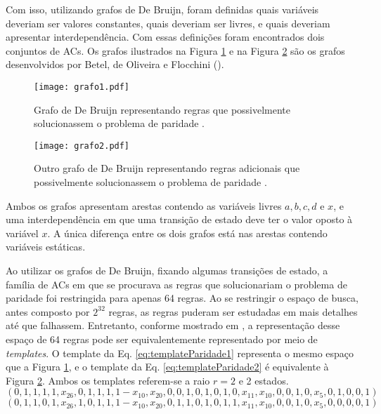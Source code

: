 Com isso, utilizando grafos de De Bruijn, foram definidas quais variáveis deveriam ser valores constantes, quais deveriam ser livres, e quais deveriam apresentar interdependência. Com essas definições foram encontrados dois conjuntos de ACs. Os grafos ilustrados na Figura \ref{fig:grafosDeBruijn} e na Figura \ref{fig:grafosDeBruijn2} são os grafos desenvolvidos por Betel, de Oliveira e Flocchini (\citeyear{Betel2013}).
\begin{figure}[h!]
\centering
\texttt{[image: grafo1.pdf]}
\caption{Grafo de De Bruijn representando regras que possivelmente solucionassem o problema de paridade \cite{Betel2013}.}
\label{fig:grafosDeBruijn}
\end{figure}

\begin{figure}[h!]
\centering
\texttt{[image: grafo2.pdf]}
\caption{Outro grafo de De Bruijn representando regras adicionais que possivelmente solucionassem o problema de paridade \cite{Betel2013}.}
\label{fig:grafosDeBruijn2}
\end{figure}

Ambos os grafos apresentam arestas contendo as variáveis livres $a, b, c, d \text{ e } x$, e uma interdependência em que uma transição de estado deve ter o valor oposto à variável $x$. A única diferença entre os dois grafos está nas arestas contendo variáveis estáticas.

Ao utilizar os grafos de De Bruijn, fixando algumas transições de estado, a família de ACs em que se procurava as regras que solucionariam o problema de paridade foi restringida para apenas 64 regras. Ao se restringir o espaço de busca, antes composto por $2^{32}$ regras, as regras puderam ser estudadas em mais detalhes até que falhassem. Entretanto, conforme mostrado em \cite{Verardo2014}, a representação desse espaço de 64 regras pode ser equivalentemente representado por meio de \textit{templates}. O template da Eq. \eqref{eq:templateParidade1} representa o mesmo espaço que a Figura \ref{fig:grafosDeBruijn}, e o template da Eq. \eqref{eq:templateParidade2} é equivalente à Figura \ref{fig:grafosDeBruijn2}. Ambos os templates referem-se a raio $r=2$ e 2 estados.
\begin{equation}
\left(0,1,1,1,1,x_{26},0,1,1,1,1-x_{10},x_{20},0,0,1,0,1,0,1,0,x_{11},x_{10},0,0,1,0,x_5,0,1,0,0,1\right)
\label{eq:templateParidade1}
\end{equation}
\begin{equation}
\left(0,1,1,0,1,x_{26},1,0,1,1,1-x_{10},x_{20},0,1,1,0,1,0,1,1,x_{11},x_{10},0,0,1,0,x_5,0,0,0,0,1\right)
\label{eq:templateParidade2}
\end{equation}


